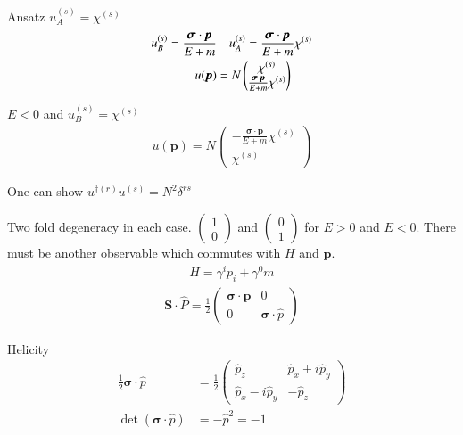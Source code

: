 Ansatz $u_A^{(s)} = \chi^{(s)}$
\begin{align}
   u_B^{(s)} = \frac{\pmb{\sigma}\cdot\pmb{p}}{E + m} &\quad u_A^{(s)} = \frac{\pmb{\sigma}\cdot\pmb{p}}{E + m} \chi^{(s)} \notag\\
   u(\pmb{p}) &= N \begin{pmatrix} \chi^{(s)} \\ \frac{\pmb{\sigma}\cdot\pmb{p}}{E + m} \chi^{(s)}\end{pmatrix}
\end{align}

$E < 0$ and $u_B^{(s)} = \chi^{(s)}$
\begin{align}
   u(\pmb{p}) = N \begin{pmatrix} -\frac{\pmb{\sigma}\cdot\pmb{p}}{E + m} \chi^{(s)} \\ \chi^{(s)}\end{pmatrix}
\end{align}

One can show $u^{\dagger (r)} u^{(s)} = N^2 \delta^{rs}$

Two fold degeneracy in each case. $ \begin{pmatrix} 1 \\ 0\end{pmatrix}$ and $ \begin{pmatrix} 0 \\ 1\end{pmatrix} $ for $E > 0$ and $E < 0$. There must be another observable which commutes with $H$ and $\pmb{p}$.
\begin{align*}
   H = \gamma^i p_i + \gamma^0 m
\end{align*}
\begin{align}
   \pmb{S} \cdot \hat{P} = \frac{1}{2} \begin{pmatrix} \pmb{\sigma}\cdot\pmb{p} & 0 \\ 0 & \pmb{\sigma}\cdot \hat{p}\end{pmatrix}
\end{align}

Helicity
\begin{align}
   \frac{1}{2} \pmb{\sigma} \cdot {\hat{p}} &= \frac{1}{2} \begin{pmatrix} \hat{p}_z & \hat{p}_x + i\hat{p}_y \\ \hat{p}_x -i \hat{p}_y & -\hat{p}_z\end{pmatrix} \\
   \det(\pmb{\sigma} \cdot \hat{p}) &= - \hat{p}^2 = - 1
\end{align}
  
